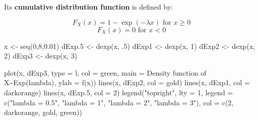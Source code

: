\documentclass[
  letterpaper,
  DIV=11,
  numbers=noendperiod]{scrreprt}
\newenvironment{Shaded}{\begin{snugshade}}{\end{snugshade}}
\newcommand{\AttributeTok}[1]{\textcolor[rgb]{0.40,0.45,0.13}{#1}}
\newcommand{\DecValTok}[1]{\textcolor[rgb]{0.68,0.00,0.00}{#1}}
\newcommand{\FloatTok}[1]{\textcolor[rgb]{0.68,0.00,0.00}{#1}}
\newcommand{\FunctionTok}[1]{\textcolor[rgb]{0.28,0.35,0.67}{#1}}
\newcommand{\NormalTok}[1]{\textcolor[rgb]{0.00,0.23,0.31}{#1}}
\newcommand{\OtherTok}[1]{\textcolor[rgb]{0.00,0.23,0.31}{#1}}
\newcommand{\StringTok}[1]{\textcolor[rgb]{0.13,0.47,0.30}{#1}}
\begin{document}
Its \textbf{cumulative distribution function} is defined by:

\[F_X(x) = 1 - \exp{(- \lambda x)} \text{ for } x \geq 0\]
\[F_X(x) = 0 \text{ for } x < 0\]

\begin{Shaded}
\begin{Highlighting}[]
\NormalTok{x }\OtherTok{\textless{}{-}} \FunctionTok{seq}\NormalTok{(}\DecValTok{0}\NormalTok{,}\DecValTok{8}\NormalTok{,}\FloatTok{0.01}\NormalTok{)}
\NormalTok{dExp}\FloatTok{.5} \OtherTok{\textless{}{-}} \FunctionTok{dexp}\NormalTok{(x, .}\DecValTok{5}\NormalTok{)}
\NormalTok{dExp1 }\OtherTok{\textless{}{-}} \FunctionTok{dexp}\NormalTok{(x, }\DecValTok{1}\NormalTok{)}
\NormalTok{dExp2 }\OtherTok{\textless{}{-}} \FunctionTok{dexp}\NormalTok{(x, }\DecValTok{2}\NormalTok{)}
\NormalTok{dExp3 }\OtherTok{\textless{}{-}} \FunctionTok{dexp}\NormalTok{(x, }\DecValTok{3}\NormalTok{)}
\end{Highlighting}
\end{Shaded}

\begin{Shaded}
\begin{Highlighting}[]
\FunctionTok{plot}\NormalTok{(x, dExp3, }\AttributeTok{type =} \StringTok{\textquotesingle{}l\textquotesingle{}}\NormalTok{, }\AttributeTok{col =} \StringTok{\textquotesingle{}green\textquotesingle{}}\NormalTok{,}
     \AttributeTok{main =} \StringTok{\textquotesingle{}Density function of X\textasciitilde{}Exp(lambda)\textquotesingle{}}\NormalTok{, }\AttributeTok{ylab =} \StringTok{\textquotesingle{}f(x)\textquotesingle{}}\NormalTok{)}
\FunctionTok{lines}\NormalTok{(x, dExp2, }\AttributeTok{col =} \StringTok{\textquotesingle{}gold\textquotesingle{}}\NormalTok{)}
\FunctionTok{lines}\NormalTok{(x, dExp1, }\AttributeTok{col =} \StringTok{\textquotesingle{}darkorange\textquotesingle{}}\NormalTok{)}
\FunctionTok{lines}\NormalTok{(x, dExp}\FloatTok{.5}\NormalTok{, }\AttributeTok{col =} \DecValTok{2}\NormalTok{)}
\FunctionTok{legend}\NormalTok{(}\StringTok{"topright"}\NormalTok{, }\AttributeTok{lty =} \DecValTok{1}\NormalTok{,}
       \AttributeTok{legend =} \FunctionTok{c}\NormalTok{(}\StringTok{"lambda = 0.5"}\NormalTok{, }\StringTok{"lambda = 1"}\NormalTok{, }
                  \StringTok{"lambda = 2"}\NormalTok{, }\StringTok{"lambda = 3"}\NormalTok{),}
       \AttributeTok{col =} \FunctionTok{c}\NormalTok{(}\DecValTok{2}\NormalTok{, }\StringTok{\textquotesingle{}darkorange\textquotesingle{}}\NormalTok{, }\StringTok{\textquotesingle{}gold\textquotesingle{}}\NormalTok{, }\StringTok{\textquotesingle{}green\textquotesingle{}}\NormalTok{))}
\end{Highlighting}
\end{Shaded}
\end{document}
